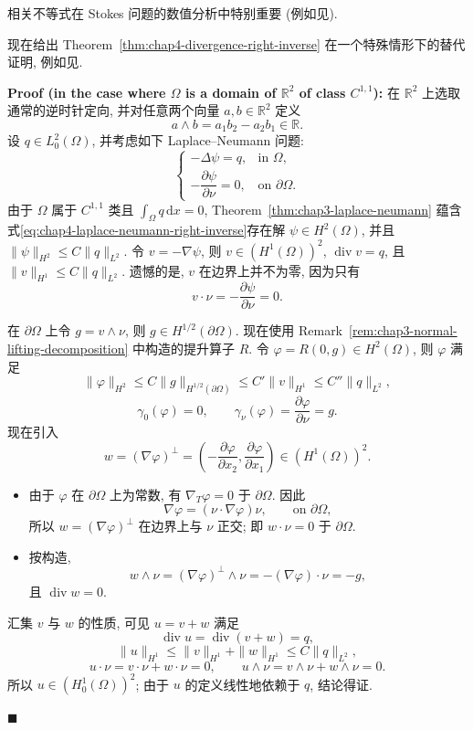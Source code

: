 相关不等式在 Stokes 问题的数值分析中特别重要 (例如见).

现在给出 Theorem~\ref{thm:chap4-divergence-right-inverse} 在一个特殊情形下的替代证明, 例如见.

\par\vspace{0.1cm}\noindent\textbf{Proof (in the case where $\Omega$ is a domain of $\mathbb R^2$ of class $C^{1,1}$):}\quad
在 $\mathbb R^2$ 上选取通常的逆时针定向, 并对任意两个向量 $a,b\in\mathbb R^2$ 定义
\[
 a\wedge b=a_1b_2-a_2b_1\in\mathbb R.
\]
设 $q\in L_0^2(\Omega)$, 并考虑如下 Laplace--Neumann 问题:
\begin{equation}
 \begin{cases}
  -\Delta\psi=q,&\text{in }\Omega,\\
  -\dfrac{\partial\psi}{\partial\nu}=0,&\text{on }\partial\Omega.
 \end{cases}
 \label{eq:chap4-laplace-neumann-right-inverse}
\end{equation}
由于 $\Omega$ 属于 $C^{1,1}$ 类且 $\int_\Omega q\,\mathrm dx=0$, Theorem~\ref{thm:chap3-laplace-neumann} 蕴含式\eqref{eq:chap4-laplace-neumann-right-inverse}存在解 $\psi\in H^2(\Omega)$, 并且 $\|\psi\|_{H^2}\leq C\|q\|_{L^2}$. 令 $v=-\nabla\psi$, 则 $v\in(H^1(\Omega))^2$, $\operatorname{div}v=q$, 且 $\|v\|_{H^1}\leq C\|q\|_{L^2}$. 遗憾的是, $v$ 在边界上并不为零, 因为只有
\[
 v\cdot\nu=-\frac{\partial\psi}{\partial\nu}=0.
\]

在 $\partial\Omega$ 上令 $g=v\wedge\nu$, 则 $g\in H^{1/2}(\partial\Omega)$. 现在使用 Remark~\ref{rem:chap3-normal-lifting-decomposition} 中构造的提升算子 $R$. 令 $\varphi=R(0,g)\in H^2(\Omega)$, 则 $\varphi$ 满足
\[
 \|\varphi\|_{H^2}
 \leq C\|g\|_{H^{1/2}(\partial\Omega)}
 \leq C'\|v\|_{H^1}
 \leq C''\|q\|_{L^2},
\]
\[
 \gamma_0(\varphi)=0,
 \qquad
 \gamma_\nu(\varphi)=\frac{\partial\varphi}{\partial\nu}=g.
\]
现在引入
\[
 w=(\nabla\varphi)^\perp
 =\left(-\frac{\partial\varphi}{\partial x_2},
 \frac{\partial\varphi}{\partial x_1}\right)
 \in(H^1(\Omega))^2.
\]
\begin{itemize}
 \item 由于 $\varphi$ 在 $\partial\Omega$ 上为常数, 有 $\nabla_T\varphi=0$ 于 $\partial\Omega$. 因此
 \[
  \nabla\varphi=(\nu\cdot\nabla\varphi)\nu,
  \qquad\text{on }\partial\Omega,
 \]
 所以 $w=(\nabla\varphi)^\perp$ 在边界上与 $\nu$ 正交; 即 $w\cdot\nu=0$ 于 $\partial\Omega$.
 \item 按构造,
 \[
  w\wedge\nu=(\nabla\varphi)^\perp\wedge\nu
  =-(\nabla\varphi)\cdot\nu=-g,
 \]
 且 $\operatorname{div}w=0$.
\end{itemize}
汇集 $v$ 与 $w$ 的性质, 可见 $u=v+w$ 满足
\[
 \operatorname{div}u=\operatorname{div}(v+w)=q,
\]
\[
 \|u\|_{H^1}\leq\|v\|_{H^1}+\|w\|_{H^1}
 \leq C\|q\|_{L^2},
\]
\[
 u\cdot\nu=v\cdot\nu+w\cdot\nu=0,
 \qquad
 u\wedge\nu=v\wedge\nu+w\wedge\nu=0.
\]
所以 $u\in(H_0^1(\Omega))^2$; 由于 $u$ 的定义线性地依赖于 $q$, 结论得证.
\par\hfill$\blacksquare$\par\vspace{0.1cm}

